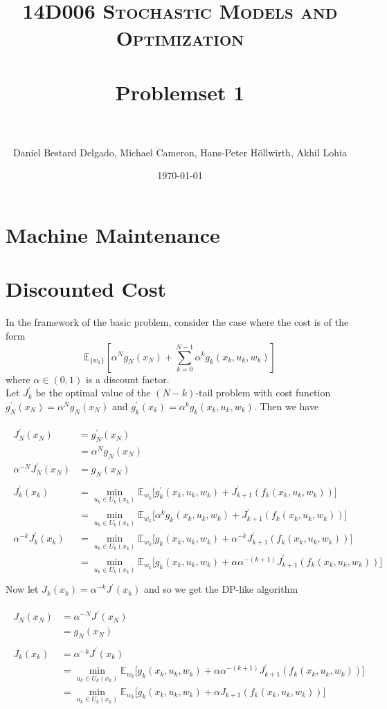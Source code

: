 \documentclass[11pt, oneside]{article}   	%
\title{	
\normalfont \normalsize 
\textsc{14D006 Stochastic Models and Optimization} \\ [25pt] %
\horrule{0.5pt} \\[0.4cm] %
\huge Problemset 1\\ %
\horrule{2pt} \\[0.5cm] %
}
\author{Daniel Bestard Delgado, Michael Cameron, Hans-Peter H{\"o}llwirth, Akhil Lohia} %
\date{\normalsize\today} %
\begin{document}
\maketitle


\section{Machine Maintenance}


\section{Discounted Cost}
In the framework of the basic problem, consider the case where the cost is of the form $$\mathbb{E}_{\{w_k\}}[\alpha^N g_N(x_N) + \sum_{k=0}^{N-1} \alpha^k g_k(x_k, u_k, w_k)]$$ where $\alpha \in (0,1)$ is a discount factor. \\

Let $J^{'}_{k}$ be the optimal value of the $(N-k)$-tail problem with cost function $g^{'}_N (x_N) = \alpha^N g_N(x_N)$ and $g^{'}_k (x_k) = \alpha^k g_k(x_k, u_k, w_k)$. Then we have

\begin{align} 
\begin{split}
J^{'}_N(x_N) &= g^{'}_N (x_N)\\ 
&= \alpha^N g_N(x_N)\\
\alpha^{-N} J^{'}_N(x_N) &= g_N(x_N)\\
\\
J^{'}_k(x_k) &= \min_{u_k \in U_k(x_k)} \mathbb{E}_{w_k} \big[g^{'}_k(x_k, u_k, w_k) + J^{'}_{k+1}(f_k(x_k, u_k, w_k))\big]\\
&= \min_{u_k \in U_k(x_k)} \mathbb{E}_{w_k} \big[\alpha^k g_k(x_k, u_k, w_k) + J^{'}_{k+1}(f_k(x_k, u_k, w_k))\big]\\
\alpha^{-k} J^{'}_k(x_k) &= \min_{u_k \in U_k(x_k)} \mathbb{E}_{w_k} \big[g_k(x_k, u_k, w_k) + \alpha^{-k} J^{'}_{k+1}(f_k(x_k, u_k, w_k))\big]\\
&= \min_{u_k \in U_k(x_k)} \mathbb{E}_{w_k} \big[g_k(x_k, u_k, w_k) + \alpha \alpha^{-(k+1)} J^{'}_{k+1}(f_k(x_k, u_k, w_k))\big]\\
\end{split}					
\end{align} 
Now let $J_k(x_k) = \alpha^{-k} J^{'} (x_k)$ and so we get the DP-like algorithm

\begin{align} 
\begin{split}
J_N(x_N) &= \alpha^{-N} J^{'}(x_N)\\
&= g_N(x_N)\\
\\
J_k(x_k)&= \alpha^{-k} J^{'}(x_k)\\
&= \min_{u_k \in U_k(x_k)} \mathbb{E}_{w_k} \big[g_k(x_k, u_k, w_k) + \alpha \alpha^{-(k+1)} J^{'}_{k+1}(f_k(x_k, u_k, w_k))\big]\\
&= \min_{u_k \in U_k(x_k)} \mathbb{E}_{w_k} \big[g_k(x_k, u_k, w_k) + \alpha J_{k+1}(f_k(x_k, u_k, w_k))\big]\\
\end{split}					
\end{align} 
\end{document}
